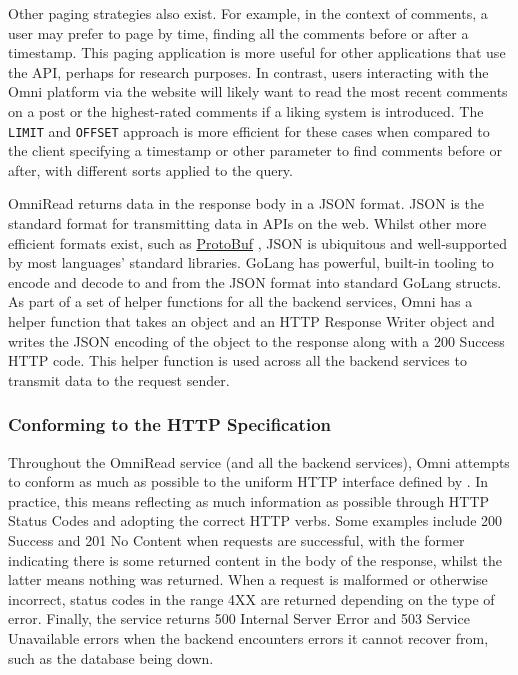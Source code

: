 

Other paging strategies also exist. For example, in the context of comments, a user may prefer to page by time, finding all the comments before or after a timestamp.
This paging application is more useful for other applications that use the API, perhaps for research purposes.
In contrast, users interacting with the Omni platform via the website will likely want to read the most recent comments on a post or the highest-rated comments if a liking system is introduced.
The \verb|LIMIT| and \verb|OFFSET| approach is more efficient for these cases when compared to the client specifying a timestamp or other parameter to find comments before or after, with different sorts applied to the query. 

OmniRead returns data in the response body in a JSON format. JSON is the standard format for transmitting data in APIs on the web.
Whilst other more efficient formats exist, such as \underline{\href{https://protobuf.dev}{ProtoBuf}} \nocite{protobuf}, JSON is ubiquitous and well-supported by most languages' standard libraries.
GoLang has powerful, built-in tooling to encode and decode to and from the JSON format into standard GoLang structs.
As part of a set of helper functions for all the backend services, Omni has a helper function that takes an object and an HTTP Response Writer object and writes the JSON encoding of the object to the response along with a 200 Success HTTP code.
This helper function is used across all the backend services to transmit data to the request sender. 



\subsubsection{Conforming to the HTTP Specification}
Throughout the OmniRead service (and all the backend services), Omni attempts to conform as much as possible to the uniform HTTP interface defined by \citeauthor{fielding1999rfc2616}.
In practice, this means reflecting as much information as possible through HTTP Status Codes and adopting the correct HTTP verbs.
Some examples include 200 Success and 201 No Content when requests are successful, with the former indicating there is some returned content in the body of the response, whilst the latter means nothing was returned.
When a request is malformed or otherwise incorrect, status codes in the range 4XX are returned depending on the type of error.
Finally, the service returns 500 Internal Server Error and 503 Service Unavailable errors when the backend encounters errors it cannot recover from, such as the database being down. 

